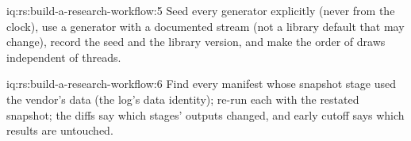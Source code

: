 \begin{solution}{iq:rs:build-a-research-workflow:5}
Seed every generator explicitly (never from the clock), use a generator with a documented stream (not a library default that may change), record the seed and the
library version, and make the order of draws independent of threads.
\end{solution}

\begin{solution}{iq:rs:build-a-research-workflow:6}
Find every manifest whose snapshot stage used the vendor's data (the log's data identity); re-run each with the restated snapshot; the diffs say which stages'
outputs changed, and early cutoff says which results are untouched.
\end{solution}

